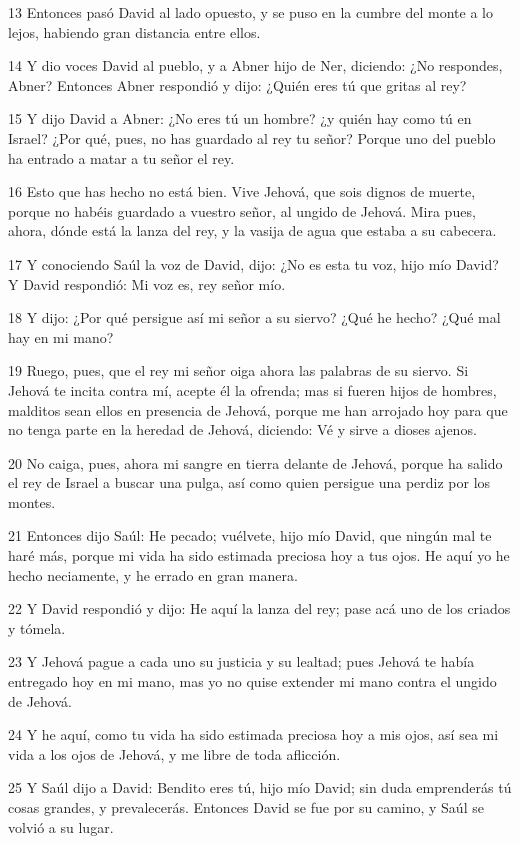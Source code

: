 {\par 13 Entonces pasó David al lado opuesto, y se puso en la cumbre del monte a lo lejos, habiendo gran distancia entre ellos.
\par 14 Y dio voces David al pueblo, y a Abner hijo de Ner, diciendo: ¿No respondes, Abner? Entonces Abner respondió y dijo: ¿Quién eres tú que gritas al rey?
\par 15 Y dijo David a Abner: ¿No eres tú un hombre? ¿y quién hay como tú en Israel? ¿Por qué, pues, no has guardado al rey tu señor? Porque uno del pueblo ha entrado a matar a tu señor el rey.
\par 16 Esto que has hecho no está bien. Vive Jehová, que sois dignos de muerte, porque no habéis guardado a vuestro señor, al ungido de Jehová. Mira pues, ahora, dónde está la lanza del rey, y la vasija de agua que estaba a su cabecera.
\par 17 Y conociendo Saúl la voz de David, dijo: ¿No es esta tu voz, hijo mío David? Y David respondió: Mi voz es, rey señor mío.
\par 18 Y dijo: ¿Por qué persigue así mi señor a su siervo? ¿Qué he hecho? ¿Qué mal hay en mi mano?
\par 19 Ruego, pues, que el rey mi señor oiga ahora las palabras de su siervo. Si Jehová te incita contra mí, acepte él la ofrenda; mas si fueren hijos de hombres, malditos sean ellos en presencia de Jehová, porque me han arrojado hoy para que no tenga parte en la heredad de Jehová, diciendo: Vé y sirve a dioses ajenos.
\par 20 No caiga, pues, ahora mi sangre en tierra delante de Jehová, porque ha salido el rey de Israel a buscar una pulga, así como quien persigue una perdiz por los montes.
\par 21 Entonces dijo Saúl: He pecado; vuélvete, hijo mío David, que ningún mal te haré más, porque mi vida ha sido estimada preciosa hoy a tus ojos. He aquí yo he hecho neciamente, y he errado en gran manera.
\par 22 Y David respondió y dijo: He aquí la lanza del rey; pase acá uno de los criados y tómela.
\par 23 Y Jehová pague a cada uno su justicia y su lealtad; pues Jehová te había entregado hoy en mi mano, mas yo no quise extender mi mano contra el ungido de Jehová.
\par 24 Y he aquí, como tu vida ha sido estimada preciosa hoy a mis ojos, así sea mi vida a los ojos de Jehová, y me libre de toda aflicción.
\par 25 Y Saúl dijo a David: Bendito eres tú, hijo mío David; sin duda emprenderás tú cosas grandes, y prevalecerás. Entonces David se fue por su camino, y Saúl se volvió a su lugar.

}
